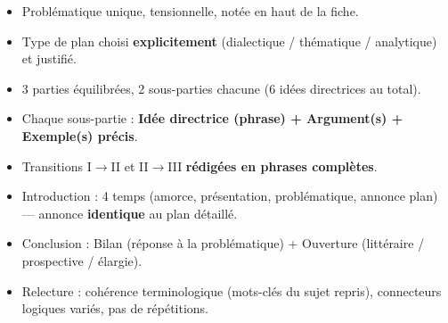 \documentclass[11pt]{article}
\begin{document}
\begin{aretenir}
\begin{itemize}
\item[$\square$] Problématique unique, tensionnelle, notée en haut de la fiche.
\item[$\square$] Type de plan choisi \textbf{explicitement} (dialectique / thématique / analytique) et justifié.
\item[$\square$] 3 parties équilibrées, 2 sous-parties chacune (6 idées directrices au total).
\item[$\square$] Chaque sous-partie : \textbf{Idée directrice (phrase) + Argument(s) + Exemple(s) précis}.
\item[$\square$] Transitions I$\to$II et II$\to$III \textbf{rédigées en phrases complètes}.
\item[$\square$] Introduction : 4 temps (amorce, présentation, problématique, annonce plan) — annonce \textbf{identique} au plan détaillé.
\item[$\square$] Conclusion : Bilan (réponse à la problématique) + Ouverture (littéraire / prospective / élargie).
\item[$\square$] Relecture : cohérence terminologique (mots-clés du sujet repris), connecteurs logiques variés, pas de répétitions.
\end{itemize}
\end{aretenir}
\end{document}
